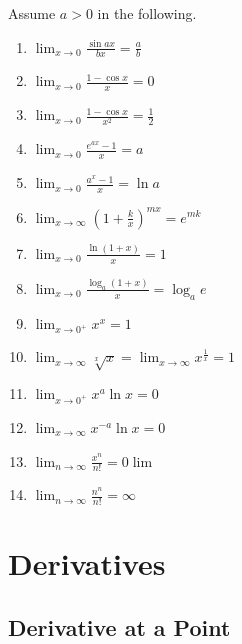 \documentclass[a4paper,11pt]{article}
\begin{document}
\begin{tcolorbox}
    Assume $a > 0$ in the following.
    
    \begin{multicols}{2}
        \begin{enumerate}
            \item \( \lim_{x \to 0} \frac{\sin ax}{bx} = \frac{a}{b} \)
            \item \( \lim_{x \to 0} \frac{1 - \cos x}{x} = 0 \)
            \item \( \lim_{x \to 0} \frac{1 - \cos x}{x^2} = \frac{1}{2} \)
            \item \( \lim_{x \to 0} \frac{e^{ax} - 1}{x} = a \)
            \item \( \lim_{x \to 0} \frac{a^x - 1}{x} = \ln a \)
            \item \( \lim_{x \to \infty} \left(1 + \frac{k}{x}\right)^{mx} = e^{mk} \)
            \item \( \lim_{x \to 0} \frac{\ln(1 + x)}{x} = 1 \)
            \item \( \lim_{x \to 0} \frac{\log_a(1 + x)}{x} = \log_a e \)
            \item \( \lim_{x \to 0^+} x^x = 1 \)
            \item \( \lim_{x \to \infty} \sqrt[x]{x} = \lim_{x \to \infty} x^{\frac{1}{x}} = 1 \)
            \item \( \lim_{x \to 0^+} x^a \ln x = 0 \)
            \item \( \lim_{x \to \infty} x^{-a} \ln x = 0 \)
            \item \( \lim_{n \to \infty} \frac{x^n}{n!} = 0 \lim\limits \)
            \item \( \lim_{n \to \infty} \frac{n^n}{n!} = \infty \)
        \end{enumerate}
    \end{multicols}
        
\end{tcolorbox}




\section{Derivatives}




\subsection{Derivative at a Point}
\end{document}
